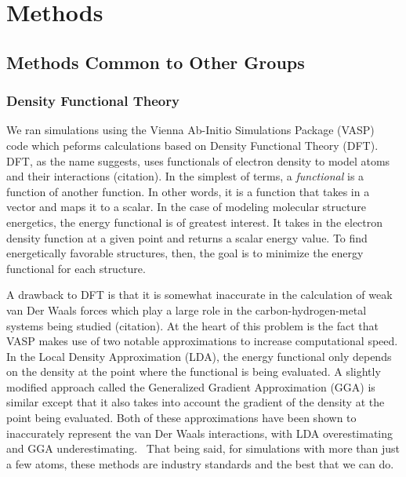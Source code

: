 \documentclass[oneside, noacknowlegments]{BYUPhys}
\begin{document}
\chapter{Methods}

\section{Methods Common to Other Groups}
\label{sec:common_methods}

\subsection{Density Functional Theory}

We ran simulations using the Vienna Ab-Initio Simulations Package 
(VASP)~\cite{KresseMDLiqMetals, KresseMDGermanium, 
KresseEfficiencyPWBasis, KresseIterativeSchemes} code which peforms 
calculations based on Density Functional Theory (DFT). DFT, as the 
name suggests, uses functionals of electron density to model atoms 
and their interactions (citation). In the simplest of terms, a
\textit{functional} is a function of another function. In other 
words, it is a function that takes in a vector and maps it to a 
scalar. In the case of modeling molecular structure energetics, the 
energy functional is of greatest interest. It takes in the electron 
density function at a given point and returns a scalar energy 
value. To find energetically favorable structures, then, the goal 
is to minimize the energy functional for each 
structure. 

A drawback to DFT is that it is somewhat inaccurate in the 
calculation of weak van Der Waals forces which play a large role in 
the carbon-hydrogen-metal systems being studied (citation). At the 
heart of this problem is the fact that VASP makes use of two 
notable approximations to increase computational speed. In the 
Local Density Approximation (LDA), the energy functional only 
depends on the density at the point where the functional is being 
evaluated. A slightly modified approach called the Generalized 
Gradient Approximation (GGA) is similar except that it also takes 
into account the gradient of the density at the point being 
evaluated. Both of these approximations have been shown to 
inaccurately represent the van Der Waals interactions, with LDA 
overestimating and GGA underestimating.~\cite{HussainPathak2012} 
That being said, for simulations with more than just a few atoms, 
these methods are industry standards and the best that we can do.
\end{document}
